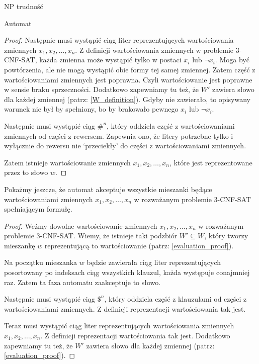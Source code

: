 \documentclass{article}
\theoremstyle{definition}
\theoremstyle{remark}
\begin{document}
\begin{section}{NP trudność}
\begin{subsection}{Automat}
\begin{proof}
         Następnie musi wystąpić ciąg liter reprezentujących wartościowania zmiennych
         $x_1, x_2, \ldots, x_n$. Z definicji wartościowania zmiennych w problemie
         3-CNF-SAT, każda zmienna może wystąpić tylko w postaci $x_i$ lub $\neg x_i$.
         Moga być powtórzenia, ale nie mogą wystąpić obie formy tej samej zmiennej.
         Zatem część z wartościowaniami zmiennych jest poprawna. Czyli wartościowanie
         jest poprawne w sensie braku sprzeczności. Dodatkowo zapewniamy tu też, że $W'$
         zawiera słowo dla każdej zmiennej (patrz: \ref{W_definition}). Gdyby nie
         zawierało, to opisywany warunek nie był by spełniony, bo by brakowało pewnego
         $x_i$ lub $\neg x_i$.

         Następnie musi wystąpić ciąg $ \#^n $, który oddziela część z wartościowaniami
         zmiennych od części z rewersem. Zapewnia ono, że litery potrzebne tylko i
         wyłącznie do rewersu nie `przeciekły' do części z wartościowaniami zmiennych.

         Zatem istnieje wartościowanie zmiennych $x_1, x_2, \ldots, x_n$, które jest
         reprezentowane przez to słowo $w$.
     \end{proof}

     Pokażmy jeszcze, że automat akceptuje wszystkie mieszanki będące
     wartościowaniami zmiennych $x_1, x_2, \ldots, x_n$ w rozważanym problemie
     3-CNF-SAT spełniającym formułę.

     \begin{proof}
         Weźmy dowolne wartościowanie zmiennych $x_1, x_2, \ldots, x_n$ w rozważanym problemie 3-CNF-SAT.
         Wiemy, że istnieje taki podzbiór $W' \subseteq W$, który tworzy mieszankę $w$ reprezentującą to wartościowanie (patrz: \ref{evaluation_proof}).

         Na początku mieszanka $w$ będzie zawierała ciąg liter reprezentujących
         posortowany po indeksach ciąg wszystkich klauzul, każda występuje conajmniej
         raz. Zatem ta faza automatu zaakceptuje to słowo.

         Następnie musi wystąpić ciąg $ \$^n $, który oddziela część z klauzulami od
         części z wartościowaniami zmiennych. Z definicji reprezentacji wartościowania
         tak jest.

         Teraz musi wystąpić ciąg liter reprezentujących wartościowania zmiennych $x_1,
             x_2, \ldots, x_n$. Z definicji reprezentacji wartościowania tak jest. Dodatkowo
         zapewniamy tu też, że $W'$ zawiera słowo dla każdej zmiennej (patrz:
         \ref{evaluation_proof}).


\end{proof}
\end{subsection}
\end{section}
\end{document}
